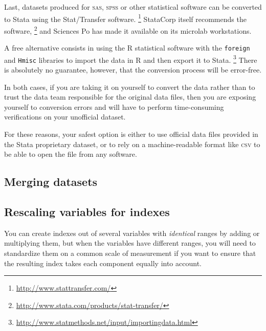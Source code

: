
Last, datasets produced for \textsc{sas}, \textsc{spss} or other statistical software can be converted to Stata using the Stat/Transfer software.%
  \footnote{\url{http://www.stattransfer.com/}} %
StataCorp itself recommends the software,%
  \footnote{\url{http://www.stata.com/products/stat-transfer/}} %
and Sciences Po has made it available on its microlab workstations.

A free alternative consists in using the R statistical software with the \texttt{foreign} and \texttt{Hmisc} libraries to import the data in R and then export it to Stata.%
  \footnote{\url{http://www.statmethods.net/input/importingdata.html}} %
There is absolutely no guarantee, however, that the conversion process will be error-free.

In both cases, if you are taking it on yourself to convert the data rather than to trust the data team responsible for the original data files, then you are exposing yourself to conversion errors and will have to perform time-consuming verifications on your unofficial dataset.

For these reasons, your safest option is either to use official data files provided in the Stata proprietary dataset, or to rely on a machine-readable format like \textsc{csv} to be able to open the file from any software.

%
\subsection{Merging datasets}
\label{sec:merge}





%
\subsection{Rescaling variables for indexes}

You can create indexes out of several variables with \emph{identical} ranges by adding or multiplying them, but when the variables have different ranges, you will need to standardize them on a common scale of measurement if you want to ensure that the resulting index takes each component equally into account.

